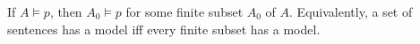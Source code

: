 If $A \models p$, then $A_0 \models p$ for some finite subset $A_0$ of $A$. Equivalently, a set of sentences has a model iff every finite subset has a model.
